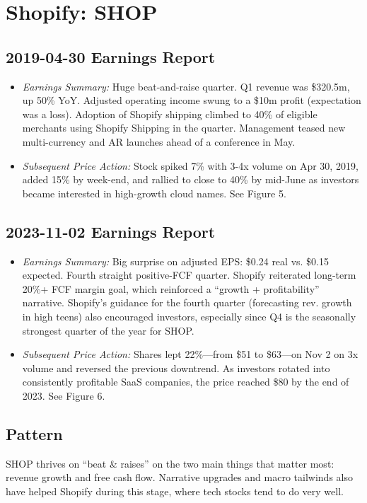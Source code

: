 \documentclass[11pt]{article}
\begin{document}
\section{Shopify: SHOP}
    \subsection{2019-04-30 Earnings Report} 
        \begin{itemize}
            \item \textit{Earnings Summary:} Huge beat-and-raise quarter. Q1 revenue was \$320.5m, up 50\% YoY. Adjusted operating income swung to a \$10m profit (expectation was a loss). Adoption of Shopify shipping climbed to 40\% of eligible merchants using Shopify Shipping in the quarter. Management teased new multi-currency and AR launches ahead of a conference in May.
            \item \textit{Subsequent Price Action:} Stock spiked 7\% with 3-4x volume on Apr 30, 2019, added 15\% by week-end, and rallied to close to 40\% by mid-June as investors became interested in high-growth cloud names. See Figure 5.
        \end{itemize}
    \subsection{2023-11-02 Earnings Report} 
        \begin{itemize}
            \item \textit{Earnings Summary:} Big surprise on adjusted EPS: \$0.24 real vs. \$0.15 expected. Fourth straight positive-FCF quarter. Shopify reiterated long-term 20\%+ FCF margin goal, which reinforced a ``growth + profitability'' narrative. Shopify's guidance for the fourth quarter (forecasting rev. growth in high teens) also encouraged investors, especially since Q4 is the seasonally strongest quarter of the year for SHOP.
            \item \textit{Subsequent Price Action:} Shares lept 22\%---from \$51 to \$63---on Nov 2 on 3x volume and reversed the previous downtrend. As investors rotated into consistently profitable SaaS companies, the price reached \$80 by the end of 2023. See Figure 6.
        \end{itemize}
    \subsection{Pattern}
        SHOP thrives on ``beat \& raises'' on the two main things that matter most: revenue growth and free cash flow. Narrative upgrades and macro tailwinds also have helped Shopify during this stage, where tech stocks tend to do very well.
\end{document}
